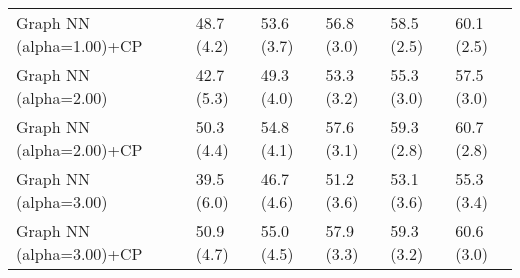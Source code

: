 \documentclass{article}
\begin{document}
\begin{table*}[t!]
\begin{center}
\begin{small}
\begin{sc}
\begin{tabular}{llllll}
Graph NN (alpha=1.00)+CP&48.7 (4.2)      &53.6 (3.7)      &56.8 (3.0)      &58.5 (2.5)      &60.1 (2.5)      \\
Graph NN (alpha=2.00)&42.7 (5.3)      &49.3 (4.0)      &53.3 (3.2)      &55.3 (3.0)      &57.5 (3.0)      \\
Graph NN (alpha=2.00)+CP&50.3 (4.4)      &54.8 (4.1)      &57.6 (3.1)      &59.3 (2.8)      &60.7 (2.8)      \\
Graph NN (alpha=3.00)&39.5 (6.0)      &46.7 (4.6)      &51.2 (3.6)      &53.1 (3.6)      &55.3 (3.4)      \\
Graph NN (alpha=3.00)+CP&50.9 (4.7)      &55.0 (4.5)      &57.9 (3.3)      &59.3 (3.2)      &60.6 (3.0)      \\
\bottomrule
\end{tabular}
\end{sc}
\end{small}
\end{center}
\vskip -0.1in
\end{table*}
\end{document}
